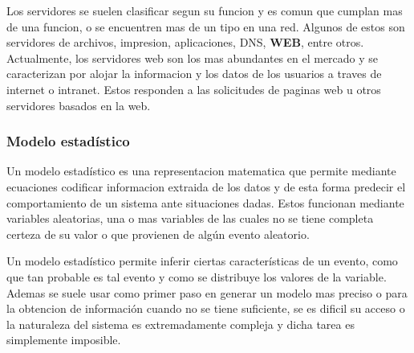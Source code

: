 Los servidores se suelen clasificar segun su funcion y es comun que cumplan mas
de una funcion, o se encuentren mas de un tipo en una red. Algunos de estos son
servidores de archivos, impresion, aplicaciones, DNS, \textbf{WEB}, entre otros.
Actualmente, los servidores web son los mas abundantes en el mercado
y se caracterizan por alojar la informacion y los datos de los usuarios a traves
de internet o intranet. Estos responden a las solicitudes de paginas web u otros
servidores basados en la web.


\subsubsection{Modelo estadístico}

Un modelo estadístico es una representacion matematica que permite mediante
ecuaciones codificar informacion extraida de los datos y de esta forma
predecir el comportamiento de un sistema ante situaciones dadas. Estos
funcionan mediante  variables aleatorias, una o mas variables de las cuales no
se tiene completa certeza de su valor o que provienen de algún evento aleatorio.

Un modelo estadístico permite inferir ciertas características de un evento,
como que tan probable es tal evento y como se distribuye los valores de la
variable. Ademas se suele usar como primer paso en generar un modelo mas
preciso o para la obtencion de información cuando no se tiene suficiente, se
es dificil su acceso o la naturaleza del
sistema es extremadamente compleja y dicha tarea es simplemente imposible.
